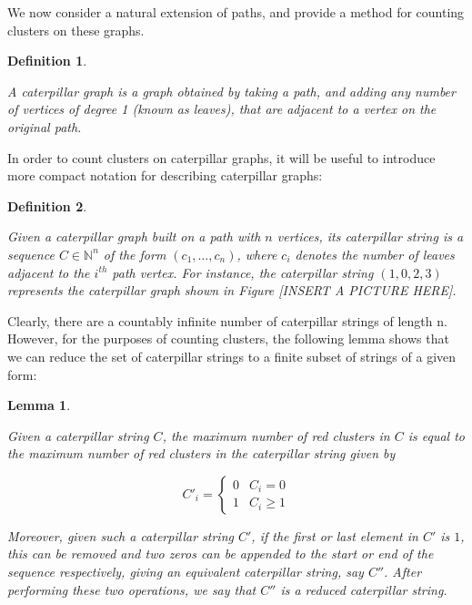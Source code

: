 \documentclass{mpaper}
\newtheorem{definition}{Definition}[section]
\newtheorem{lemma}{Lemma}[section]
\begin{document}
We now consider a natural extension of paths, and provide a method for counting clusters on these graphs.

\begin{definition}
  \label{def/caterpillars}

  A \emph{caterpillar graph} is a graph obtained by taking a path, and adding any number of vertices of degree 1 (known as leaves), that are adjacent to a vertex on the original path.

\end{definition}

In order to count clusters on caterpillar graphs, it will be useful to introduce more compact notation for describing caterpillar graphs:

\begin{definition}
  \label{def/caterpillar-strings}

  Given a caterpillar graph built on a path with $n$ vertices, its \emph{caterpillar string} is a sequence $C \in \mathbb{N}^n$ of the form $(c_1, \dots, c_n)$, where $c_i$ denotes the number of leaves adjacent to the $i^{th}$ path vertex. For instance, the caterpillar string $(1,0,2,3)$ represents the caterpillar graph shown in Figure [INSERT A PICTURE HERE].

\end{definition}

Clearly, there are a countably infinite number of caterpillar strings of length n. However, for the purposes of counting clusters, the following lemma shows that we can reduce the set of caterpillar strings to a finite subset of strings of a given form:

\begin{lemma}
  \label{lem/reduced-caterpillars}

  Given a caterpillar string $C$, the maximum number of red clusters in $C$ is equal to the maximum number of red clusters in the caterpillar string given by

  \begin{equation*}
  C'_i = \begin{cases}
    0 & C_i = 0 \\
    1 & C_i \geq 1
  \end{cases}
  \end{equation*}

  Moreover, given such a caterpillar string $C'$, if the first or last element in $C'$ is $1$, this can be removed and two zeros can be appended to the start or end of the sequence respectively, giving an equivalent caterpillar string, say $C''$. After performing these two operations, we say that $C''$ is a \emph{reduced caterpillar string}.
\end{lemma}
\end{document}
